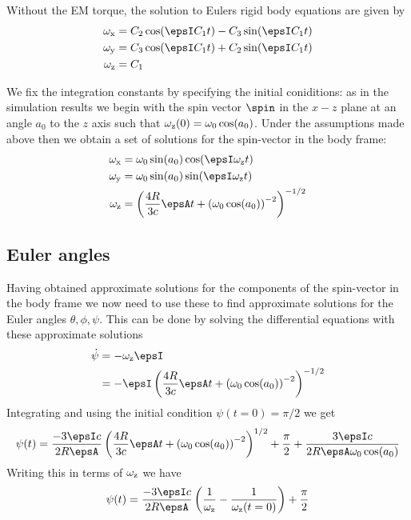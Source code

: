 \documentclass[/home/greg/Thesis/main/main.tex]{subfiles}
\begin{document}
Without the EM torque, the solution to Eulers rigid body equations are given by
\begin{align}
\wx &= C_2 \cos(\epsI C_1 t) - C_3 \sin(\epsI C_1 t) \\
\wy &= C_3 \cos(\epsI C_1 t) + C_2 \sin(\epsI C_1 t) \\
\wz &= C_1 
\end{align}

We fix the integration constants by specifying the initial coniditions: as in
the simulation results we begin with the spin vector $\spin$ in the $x-z$ plane
at an angle $a_{0}$ to the $z$ axis such that $\omega_{\mathrm{z}}(0) = \omega_{0}\cos(a_{0})$.
Under the assumptions made above then we obtain a set of solutions for the
spin-vector in the body frame:
\begin{align}
\wx &= \omega_0 \sin(a_0) \cos(\epsI \wz t)  \\
\wy &= \omega_0 \sin(a_0) \sin(\epsI \wz t) \\
\wz &= \left(\frac{4R}{3c} \epsA t + \left(\omega_0 \cos(a_0)\right)^{-2}\right)^{-1/2}
\end{align}

\subsection{Euler angles}
Having obtained approximate solutions for the components of the spin-vector in
the body frame we now need to use these to find approximate solutions for the
Euler angles $\theta, \phi, \psi$. This can be done by solving the differential
equations with these approximate solutions
\begin{align}
    \dot{\psi} &= -\wz \epsI \\
    &= -\epsI\left(\frac{4R}{3c} \epsA t + \left(\omega_0 \cos(a_0)\right)^{-2}\right)^{-1/2}
\end{align}
Integrating and using the initial condition $\psi(t=0) = \pi/2$ we get
\begin{align}
\psi(t) = \frac{-3\epsI c}{2 R \epsA} 
          \left(\frac{4R}{3c} \epsA t + \left(\omega_0 \cos(a_0)\right)^{-2}\right)^{1/2}
          + \frac{\pi}{2} + \frac{3 \epsI c}{2 R \epsA \omega_0 \cos(a_0)}
\end{align}
Writing this in terms of $\omega_{\mathrm{z}}$ we have
\begin{align}
\psi(t) = \frac{-3\epsI c}{2 R \epsA} 
          \left(\frac{1}{\wz} - \frac{1}{\wz(t=0)}\right)
          + \frac{\pi}{2} 
\end{align}

\biblio
\end{document}
